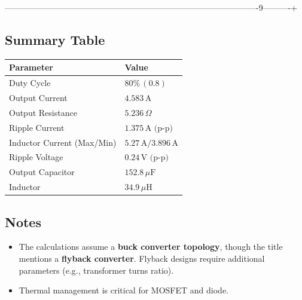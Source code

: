 -------------------------------------------------------------------------------------------9----------+\documentclass{article}
\begin{document}
\subsection*{Summary Table}
\begin{tabular}{ll}
    \toprule
    \textbf{Parameter} & \textbf{Value} \\
    \midrule
    Duty Cycle & \( 80\% \, (0.8) \) \\
    Output Current & \( 4.583\, \text{A} \) \\
    Output Resistance & \( 5.236\, \Omega \) \\
    Ripple Current & \( 1.375\, \text{A (p-p)} \) \\
    Inductor Current (Max/Min) & \( 5.27\, \text{A} / 3.896\, \text{A} \) \\
    Ripple Voltage & \( 0.24\, \text{V (p-p)} \) \\
    Output Capacitor & \( 152.8\, \mu\text{F} \) \\
    Inductor & \( 34.9\, \mu\text{H} \) \\
    \bottomrule
\end{tabular}

\subsection*{Notes}
\begin{itemize}
    \item The calculations assume a \textbf{buck converter topology}, though the title mentions a \textbf{flyback converter}. Flyback designs require additional parameters (e.g., transformer turns ratio).
    \item Thermal management is critical for MOSFET and diode.
\end{itemize}
\end{document}
